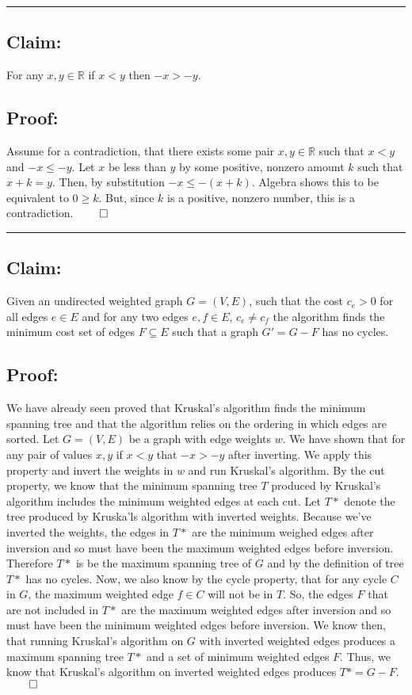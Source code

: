 \documentclass[11pt]{article}
\newcommand{\R}{\mathbb{R}}
\begin{document}
\noindent\textcolor[RGB]{220,220,220}{\rule{\linewidth}{0.8pt}}

\subsection*{Claim:}

For any $x, y \in \R$ if $x < y$ then $-x > -y$.

\subsection*{Proof:}

Assume for a contradiction, that there exists some pair $x, y \in \R$ such that $x < y$ and $-x \leq -y$. Let $x$ be less than $y$ by some positive, nonzero amount $k$ such that $x + k = y$. Then, by substitution $-x \leq -(x + k)$. Algebra shows this to be equivalent to $0 \geq k$. But, since $k$ is a positive, nonzero number, this is a contradiction. $\qed$

\noindent\textcolor[RGB]{220,220,220}{\rule{\linewidth}{0.8pt}}

\subsection*{Claim:}

Given an undirected weighted graph $G = (V, E)$, such that the cost $c_e > 0$ for all edges $e \in E$ and for any two edges $e, f \in E$, $c_e \neq c_f$ the algorithm finds the minimum cost set of edges $F \subseteq E$ such that a graph $G' = G - F$ has no cycles.

\subsection*{Proof:}

We have already seen proved that Kruskal's algorithm finds the minimum spanning tree and that the algorithm relies on the ordering in which edges are sorted. Let $G = (V, E)$ be a graph with edge weights $w$. We have shown that for any pair of values $x, y$ if $x < y$ that $-x > -y$ after inverting. We apply this property and invert the weights in $w$ and run Kruskal's algorithm. By the cut property, we know that the minimum spanning tree $T$ produced by Kruskal's algorithm includes the minimum weighted edges at each cut. Let $T*$ denote the tree produced by Kruska'ls algorithm with inverted weights. Because we've inverted the weights, the edges in $T*$ are the minimum weighed edges after inversion and so must have been the maximum weighted edges before inversion. Therefore $T*$ is be the maximum spanning tree of $G$ and by the definition of tree $T*$ has no cycles. Now, we also know by the cycle property, that for any cycle $C$ in $G$, the maximum weighted edge $f \in C$ will not be in $T$. So, the edges $F$ that are not included in $T*$ are the maximum weighted edges after inversion and so must have been the minimum weighted edges before inversion. We know then, that running Kruskal's algorithm on $G$ with inverted weighted edges produces a maximum spanning tree $T*$ and a set of minimum weighted edges $F$. Thus, we know that Kruskal's algorithm on inverted weighted edges produces $T* = G - F$. $\qed$
\end{document}
